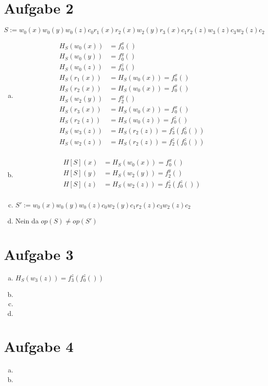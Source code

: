 \documentclass{scrartcl}
\begin{document}
\section*{Aufgabe 2}
$S := w_0(x)w_0(y)w_0(z)c_0r_1(x)r_2(x)w_2(y)r_3(x)c_1r_2(z)w_3(z)c_3w_2(z)c_2$
\begin{enumerate}[a)]
\item
\begin{align*}
H_S(w_0(x)) &= f_0^x()\\
H_S(w_0(y)) &= f_0^y()\\
H_S(w_0(z)) &= f_0^z()\\
H_S(r_1(x)) &= H_S(w_0(x)) = f_0^x()\\
H_S(r_2(x)) &= H_S(w_0(x)) = f_0^x()\\
H_S(w_2(y)) &= f_2^y()\\
H_S(r_3(x)) &= H_S(w_0(x)) = f_0^x()\\
H_S(r_2(z)) &= H_S(w_0(z)) = f_0^z()\\
H_S(w_3(z)) &= H_S(r_2(z)) = f_3^z(f_0^z())\\
H_S(w_2(z)) &= H_S(r_2(z)) = f_2^z(f_0^z())\\
\end{align*}

\item
\begin{align*}
H[S](x) &= H_S(w_0(x)) = f_0^x()\\
H[S](y) &= H_S(w_2(y)) = f_2^y()\\
H[S](z) &= H_S(w_2(z)) = f_2^z(f_0^z())\\
\end{align*}

\item 
$S' := w_0(x)w_0(y)w_0(z)c_0w_2(y)c_1r_2(z)c_3w_2(z)c_2$

\item
Nein da $op(S) \neq op(S')$
\end{enumerate}

\section*{Aufgabe 3}

\begin{enumerate}[a)]
\item
$H_S(w_3(z)) = f_3^z(f_0^z())$

\item


\item


\item
\end{enumerate}

\section*{Aufgabe 4}
\begin{enumerate}[a)]
\item
\item
\end{enumerate}
\end{document}
